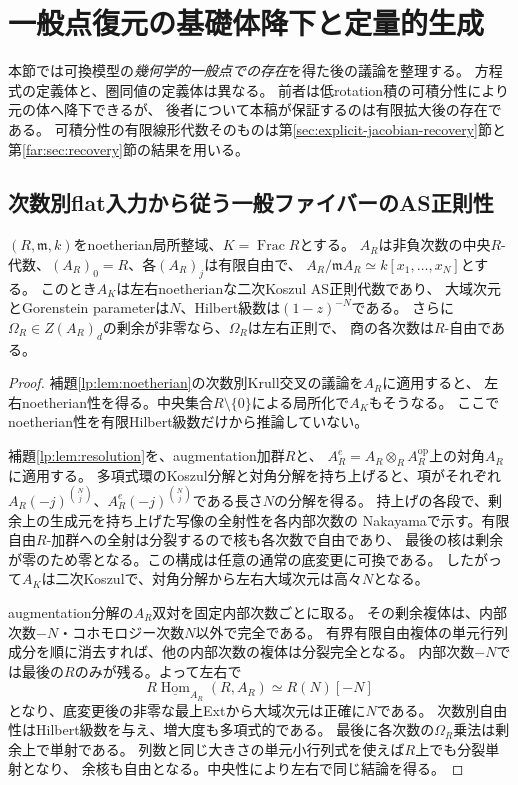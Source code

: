 \section{一般点復元の基礎体降下と定量的生成}
\label{gcd:sec:descent}

本節では可換模型の\emph{幾何学的一般点での存在}を得た後の議論を整理する。
方程式の定義体と、圏同値の定義体は異なる。
前者は低rotation積の可積分性により元の体へ降下できるが、
後者について本稿が保証するのは有限拡大後の存在である。
可積分性の有限線形代数そのものは第\ref{sec:explicit-jacobian-recovery}節と
第\ref{far:sec:recovery}節の結果を用いる。

\subsection{次数別flat入力から従う一般ファイバーのAS正則性}

\begin{proposition}[一般点のambientに対する追加仮定の除去]
\label{gcd:prop:automatic-as}
$(R,\mathfrak m,k)$をnoetherian局所整域、$K=\operatorname{Frac}R$とする。
$A_R$は非負次数の中央$R$-代数、$(A_R)_0=R$、各$(A_R)_j$は有限自由で、
$A_R/\mathfrak mA_R\simeq k[x_1,\ldots,x_N]$とする。
このとき$A_K$は左右noetherianな二次Koszul AS正則代数であり、
大域次元とGorenstein parameterは$N$、Hilbert級数は$(1-z)^{-N}$である。
さらに$\Omega_R\in Z(A_R)_d$の剰余が非零なら、$\Omega_R$は左右正則で、
商の各次数は$R$-自由である。
\end{proposition}
\begin{proof}
補題\ref{lp:lem:noetherian}の次数別Krull交叉の議論を$A_R$に適用すると、
左右noetherian性を得る。中央集合$R\setminus\{0\}$による局所化で$A_K$もそうなる。
ここでnoetherian性を有限Hilbert級数だけから推論していない。

補題\ref{lp:lem:resolution}を、augmentation加群$R$と、
$A_R^e=A_R\otimes_RA_R^{\mathrm{op}}$上の対角$A_R$に適用する。
多項式環のKoszul分解と対角分解を持ち上げると、項がそれぞれ
$A_R(-j)^{\binom Nj}$、$A_R^e(-j)^{\binom Nj}$である長さ$N$の分解を得る。
持上げの各段で、剰余上の生成元を持ち上げた写像の全射性を各内部次数の
Nakayamaで示す。有限自由$R$-加群への全射は分裂するので核も各次数で自由であり、
最後の核は剰余が零のため零となる。この構成は任意の通常の底変更に可換である。
したがって$A_K$は二次Koszulで、対角分解から左右大域次元は高々$N$となる。

augmentation分解の$A_R$双対を固定内部次数ごとに取る。
その剰余複体は、内部次数$-N$・コホモロジー次数$N$以外で完全である。
有界有限自由複体の単元行列成分を順に消去すれば、他の内部次数の複体は分裂完全となる。
内部次数$-N$では最後の$R$のみが残る。よって左右で
\begin{equation}\label{gcd:eq:as}
 R\underline{\operatorname{Hom}}_{A_R}(R,A_R)\simeq R(N)[-N]
\end{equation}
となり、底変更後の非零な最上Extから大域次元は正確に$N$である。
次数別自由性はHilbert級数を与え、増大度も多項式的である。
最後に各次数の$\Omega_R$乗法は剰余上で単射である。
列数と同じ大きさの単元小行列式を使えば$R$上でも分裂単射となり、
余核も自由となる。中央性により左右で同じ結論を得る。
\end{proof}

